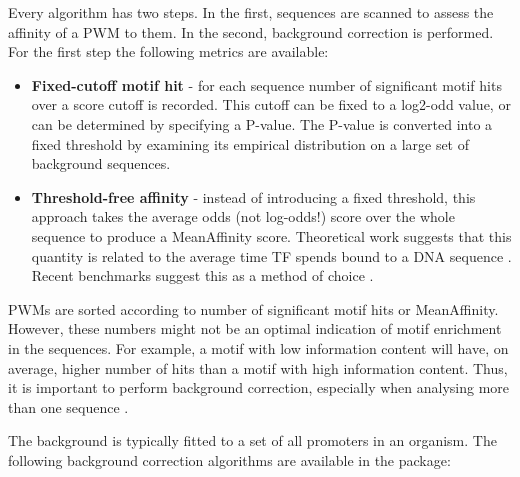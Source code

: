 \documentclass{article}
\begin{document}
Every algorithm has two steps. In the first, sequences are scanned to assess the affinity of a PWM to them. In the second, background correction is performed. For the first step the following metrics are available:

\begin{itemize}
	\item \textbf{Fixed-cutoff motif hit} - for each sequence number of significant motif hits over a score cutoff is recorded. This cutoff can be fixed to a log2-odd value, or can be determined by specifying a P-value. The P-value is converted into a fixed threshold by examining its empirical distribution on a large set of background sequences. 
	\item \textbf{Threshold-free affinity} - instead of introducing a fixed threshold, this approach takes the average odds (not log-odds!) score over the whole sequence to produce a MeanAffinity score. Theoretical work suggests that this quantity is related to the average time TF spends bound to a DNA sequence \citep{stormo2000dna}. Recent benchmarks suggest this as a method of choice \citep{stojnic_2012}. 
\end{itemize}

PWMs are sorted according to number of significant motif hits or MeanAffinity. However, these numbers might not be an optimal indication of motif enrichment in the sequences. For example, a motif with low information content will have, on average, higher number of hits than a motif with high information content. Thus, it is important to perform background correction, especially when analysing more than one sequence \citep{stojnic_2012}. 

The background is typically fitted to a set of all promoters in an organism. The following background correction algorithms are available in the package:
\end{document}
